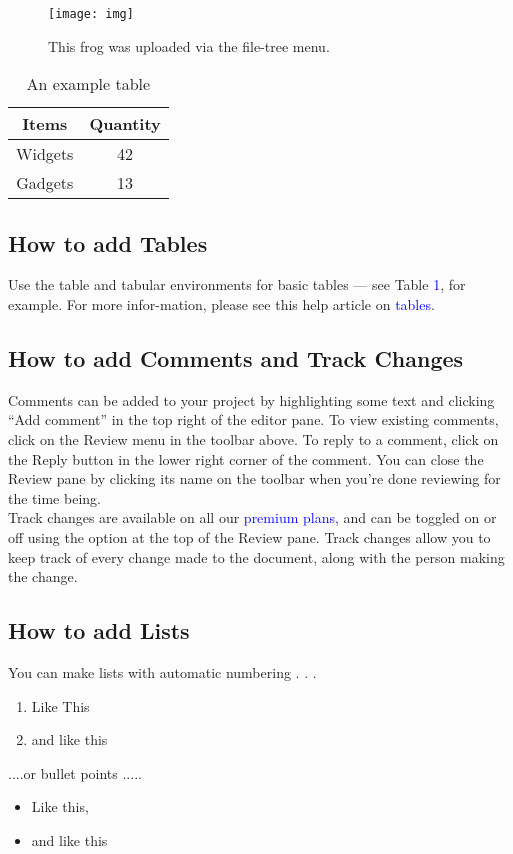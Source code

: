 \documentclass{article}
\begin{document}
\begin{figure}
	\centering
	\texttt{[image: img]}
	\caption{This frog was uploaded via the file-tree menu.}
	\label{fig:img}
\end{figure}
	
	\begin{table}[h]
		\centering
		\begin{tabular}{c|c}
			\textbf{Items} & \textbf{Quantity}\\
			\hline
			Widgets & 42\\

			Gadgets & 13\\

		\end{tabular}
	\caption{An example table}
	\label{tab:example}
\end{table}
	
	\subsection{How to add Tables}
	Use the table and tabular environments for basic tables — see Table \textcolor{blue}{1}, for example. For more infor-mation, please see this help article on \textcolor{blue}{tables}.
	
	\subsection{How to add Comments and Track Changes}
	Comments can be added to your project by highlighting some text and clicking “Add comment” in the top right of the editor pane. To view existing comments, click on the Review menu in the toolbar above. To reply to a comment, click on the Reply button in the lower right corner of the comment. You can close the Review pane by clicking its name on the toolbar when you’re done reviewing for the time being.\\
	\hspace{1cm}Track changes are available on all our \textcolor{blue}{premium plans,} and can be toggled on or off using the option at the top of the Review pane. Track changes allow you to keep track of every change made to the document, along with the person making the change.
	
	\subsection{How to add Lists}
	You can make lists with automatic numbering . . .\\
	\begin{enumerate}
		\item Like This
		\item and like this
	\end{enumerate} 
	 ....or
 bullet points .....
 \begin{itemize}
 	\item Like this,
 	\item and like this
 \end{itemize}	
\end{document}
